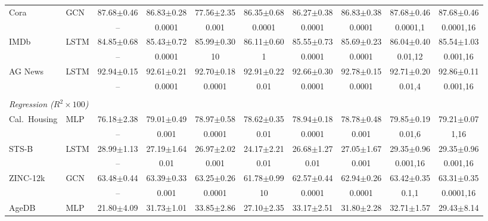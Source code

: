 \begin{table}[t]
\begin{center}
\begin{tabular}{llcccccccc}
Cora & GCN & 87.68$\pm$0.46 & 86.83$\pm$0.28 & 77.56$\pm$2.35 & 86.35$\pm$0.68 & 86.27$\pm$0.38 & 86.83$\pm$0.38 & 87.68$\pm$0.46 & 87.68$\pm$0.46 \\
 & & {\tiny --} & {\tiny 0.0001} & {\tiny 0.001} & {\tiny 0.0001} & {\tiny 0.0001} & {\tiny 0.0001} & {\tiny 0.0001,1} & {\tiny 0.0001,16} \\[0.4ex]
IMDb & LSTM & 84.85$\pm$0.68 & 85.43$\pm$0.72 & 85.99$\pm$0.30 & 86.11$\pm$0.60 & 85.55$\pm$0.73 & 85.69$\pm$0.23 & 86.04$\pm$0.40 & 85.54$\pm$1.03 \\
 & & {\tiny --} & {\tiny 0.0001} & {\tiny 10} & {\tiny 1} & {\tiny 0.0001} & {\tiny 0.0001} & {\tiny 0.01,12} & {\tiny 0.001,16} \\[0.4ex]
AG News & LSTM & 92.94$\pm$0.15 & 92.61$\pm$0.21 & 92.70$\pm$0.18 & 92.91$\pm$0.22 & 92.66$\pm$0.30 & 92.78$\pm$0.15 & 92.71$\pm$0.20 & 92.86$\pm$0.11 \\
 & & {\tiny --} & {\tiny 0.0001} & {\tiny 0.0001} & {\tiny 0.01} & {\tiny 0.0001} & {\tiny 0.0001} & {\tiny 0.01,4} & {\tiny 0.001,16} \\[0.4ex]
\\[-1.5ex]
\multicolumn{10}{l}{\emph{Regression ($R^2\times100$)}} \\[0.3ex]
Cal.\ Housing & MLP & 76.18$\pm$2.38 & 79.01$\pm$0.49 & 78.97$\pm$0.58 & 78.62$\pm$0.35 & 78.94$\pm$0.18 & 78.78$\pm$0.48 & 79.85$\pm$0.19 & 79.21$\pm$0.07 \\
 & & {\tiny --} & {\tiny 0.001} & {\tiny 0.0001} & {\tiny 0.01} & {\tiny 0.0001} & {\tiny 0.001} & {\tiny 0.01,6} & {\tiny 1,16} \\[0.4ex]
STS-B & LSTM & 28.99$\pm$1.13 & 27.19$\pm$1.64 & 26.97$\pm$2.02 & 24.17$\pm$2.21 & 26.68$\pm$1.27 & 27.05$\pm$1.67 & 29.35$\pm$0.96 & 29.35$\pm$0.96 \\
 & & {\tiny --} & {\tiny 0.01} & {\tiny 0.001} & {\tiny 0.01} & {\tiny 0.01} & {\tiny 0.001} & {\tiny 0.001,16} & {\tiny 0.001,16} \\[0.4ex]
ZINC-12k & GCN & 63.48$\pm$0.44 & 63.39$\pm$0.33 & 63.25$\pm$0.26 & 61.78$\pm$0.99 & 62.57$\pm$0.44 & 62.94$\pm$0.26 & 63.42$\pm$0.35 & 63.31$\pm$0.35 \\
 & & {\tiny --} & {\tiny 0.001} & {\tiny 0.0001} & {\tiny 10} & {\tiny 0.0001} & {\tiny 0.0001} & {\tiny 0.1,1} & {\tiny 0.0001,16} \\[0.4ex]
AgeDB & MLP & 21.80$\pm$4.09 & 31.73$\pm$1.01 & 33.85$\pm$2.86 & 27.10$\pm$2.35 & 33.17$\pm$2.51 & 31.80$\pm$2.28 & 32.71$\pm$1.57 & 29.43$\pm$8.14 \\

\end{tabular}
\end{center}
\end{table}
